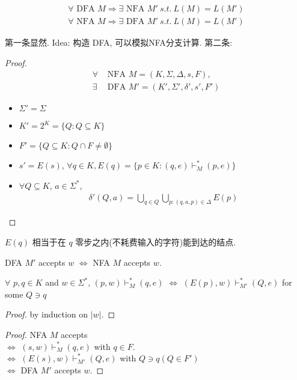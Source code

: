 \begin{theorem}
    \begin{align*}
        \forall\text{ DFA }M \Rightarrow \exists\text{ NFA }M'\ s.t.\ L(M)=L(M')\\
        \forall\text{ NFA }M \Rightarrow \exists\text{ DFA }M'\ s.t.\ L(M)=L(M')
    \end{align*}
\end{theorem}
第一条显然. Idea: 构造 DFA, 可以模拟NFA分支计算. 第二条:
\begin{proof}
    \begin{align*}
        \forall&\text{ NFA }M=(K,\Sigma, \Delta, s, F), \\
        \exists&\text{ DFA }M'=(K',\Sigma', \delta', s', F')
    \end{align*}
    \begin{itemize}
        \item $\Sigma'=\Sigma$
        \item $K'=2^K=\{ Q:Q\subseteq K \}$
        \item $F'=\{ Q\subseteq K:Q\cap F\ne \emptyset \}$
        \item $s'=E(s)$, 
        \subitem $\forall q\in K, E(q)=\{ p\in K:(q,e)\vdash_M^* (p,e) \}$
        \item $\forall Q\subseteq K$, $a\in \Sigma^*$,
        \begin{align*}
            \delta'(Q,a)=\bigcup_{q\in Q}\bigcup_{p:(q,a,p)\in\Delta}E(p)
        \end{align*}
    \end{itemize}
\end{proof}
$E(q)$ 相当于在 $q$ 零步之内(不耗费输入的字符)能到达的结点. 

\begin{theorem}
    DFA $M'$ accepts $w$ $\iff$ NFA $M$ accepts $w$. 
\end{theorem}
\begin{claim}
    $\forall$ $p,q \in K$ and $w\in\Sigma^*$, $(p,w)\vdash_M^*(q,e)$ $\iff$ $(E(p),w)\vdash_{M'}^*(Q,e)$ for some $Q\ni  q$
\end{claim}

\begin{proof}
    by induction on $|w|$. 
\end{proof}


\begin{proof}
    
    NFA  $M$ accepts \\
    $\iff$ $(s,w)\vdash_M^*(q,e)$ with $q\in F$.\\
    $\iff$ $(E(s),w)\vdash_{M'}^*(Q,e)$ with $Q\ni q (Q\in F')$\\
    $\iff$ DFA $M'$ accepts $w$. 
\end{proof}

